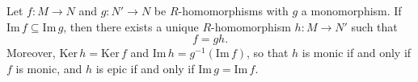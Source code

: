 Let $f: M \to N$ and $g: N' \to N$ be $R$-homomorphisms with $g$ a monomorphism. If $\text{Im}\, f \subseteq \text{Im}\, g$, then there exists a unique $R$-homomorphism $h: M \to N'$ such that
$$f = gh.$$
Moreover, $\text{Ker}\, h = \text{Ker}\, f$ and $\text{Im}\, h = g^{-1}(\text{Im}\, f)$, so that $h$ is monic if and only if $f$ is monic, and $h$ is epic if and only if $\text{Im}\, g = \text{Im}\, f$.
